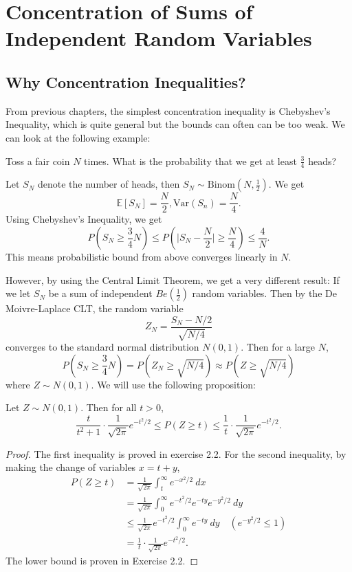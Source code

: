 \section{Concentration of Sums of Independent Random Variables}



\subsection{Why Concentration Inequalities?}
From previous chapters, the simplest concentration inequality is Chebyshev's Inequality, which is quite 
general but the bounds can often can be too weak. We can look at the following example:

\begin{example}
\label{ex:2.1.1}
Toss a fair coin $N$ times. What is the probability that we get at least $\frac{3}{4}$ heads?
\end{example}

Let $S_N$ denote the number of heads, then $S_N \sim \text{Binom}(N, \frac{1}{2})$. We get 
\[ \mathbb{E}[S_N] = \frac{N}{2}, \mathrm{Var}(S_n) = \frac{N}{4}. \]
Using Chebyshev's Inequality, we get 
\[ P(S_N \geq \frac{3}{4}N) \leq P(\bigg| S_N - \frac{N}{2} \bigg| \geq \frac{N}{4}) \leq \frac{4}{N}. \]
This means probabilistic bound from above converges linearly in $N$. 

However, by using the Central Limit Theorem, we get a very different result: If we let $S_N$ be a sum of 
independent $Be(\frac{1}{2})$ random variables. Then by the De Moivre-Laplace CLT, the random variable 
\[ Z_N = \frac{S_N - N/2}{\sqrt{N/4}} \]
converges to the standard normal distribution $N(0, 1)$. Then for a large $N$, 
\[ P(S_N \geq \frac{3}{4}N) = P(Z_N \geq \sqrt{N/4}) \approx P(Z \geq \sqrt{N/4}) \]
where $Z \sim N(0, 1)$. We will use the following proposition: 

\begin{proposition}
\label{prop:2.1.2}
Let $Z \sim N(0, 1)$. Then for all $t > 0$, 
\[  \frac{t}{t^2 + 1} \cdot \frac{1}{\sqrt{2 \pi}}e^{-t^2 / 2} \leq P(Z \geq t) 
\leq \frac{1}{t} \cdot \frac{1}{\sqrt{2 \pi}}e^{-t^2 / 2}. \]
\end{proposition}

\begin{proof}
The first inequality is proved in exercise 2.2. For the second inequality, by making the change 
of variables $x = t + y$,
\begin{align*}
	P(Z \geq t) 
	&= \frac{1}{\sqrt{2 \pi}} \int_{t}^{\infty} e^{-x^2 / 2} \ dx \\
	&= \frac{1}{\sqrt{2 \pi}} \int_{0}^{\infty} e^{-t^2 / 2} e^{-ty} e^{-y^2 / 2} \ dy \\
	&\leq \frac{1}{\sqrt{2 \pi}} e^{-t^2 / 2} \int_{0}^{\infty} e^{-ty} \ dy 
	\quad (e^{-y^2 / 2} \leq 1) \\
	&= \frac{1}{t} \cdot \frac{1}{\sqrt{2 \pi}}e^{-t^2 / 2}.
\end{align*}
The lower bound is proven in Exercise 2.2.
\end{proof}

